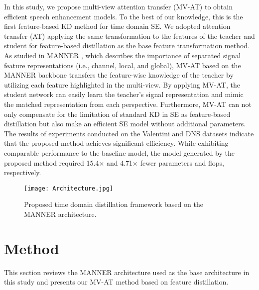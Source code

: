 \documentclass[a4paper]{article}
\begin{document}
In this study, we propose multi-view attention transfer (MV-AT) to obtain efficient speech enhancement models. To the best of our knowledge, this is the first feature-based KD method for time domain SE. We adopted attention transfer (AT) \cite{zagoruyko2016paying} applying the same transformation to the features of the teacher and student for feature-based distillation as the base feature transformation method. As studied in MANNER \cite{park2022manner}, which describes the importance of separated signal feature representations (i.e., channel, local, and global), MV-AT based on the MANNER backbone transfers the feature-wise knowledge of the teacher by utilizing each feature highlighted in the multi-view. By applying MV-AT, the student network can easily learn the teacher’s signal representation and mimic the matched representation from each perspective. Furthermore, MV-AT can not only compensate for the limitation of standard KD in SE as feature-based distillation but also make an efficient SE model without additional parameters. The results of experiments conducted on the Valentini and DNS datasets indicate that the proposed method achieves significant efficiency. While exhibiting comparable performance to the baseline model, the model generated by the proposed method required 15.4$\times$ and 4.71$\times$ fewer parameters and flops, respectively.
\begin{figure*}[t]
  \centering
  \texttt{[image: Architecture.jpg]} \caption{Proposed time domain distillation framework based on the MANNER architecture.} \label{fig:architecture}
\end{figure*}
\section{Method}
This section reviews the MANNER \cite{park2022manner} architecture used as the base architecture in this study and presents our MV-AT method based on feature distillation.
\end{document}

